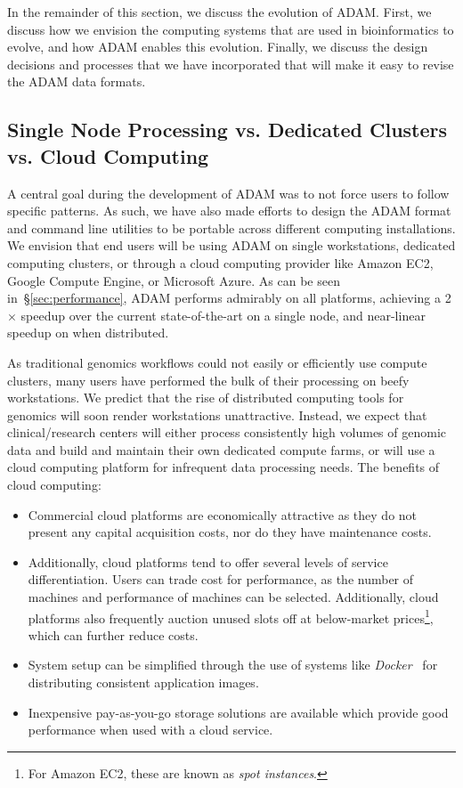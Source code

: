 \documentclass{bioinfo}
\begin{document}
In the remainder of this section, we discuss the evolution of ADAM. First, we discuss how we envision the computing systems that are used in bioinformatics to evolve, and
how ADAM enables this evolution. Finally, we discuss the design decisions and processes that we have incorporated that will make it easy to revise the ADAM data formats.

\subsection{Single Node Processing vs. Dedicated Clusters vs. Cloud Computing}
\label{sec:single-vs-clusters-vs-cloud}

A central goal during the development of ADAM was to not force users to follow specific patterns. As such, we have also made efforts to design the ADAM format and command
line utilities to be portable across different computing installations. We envision that end users will be using ADAM on single workstations, dedicated computing
clusters, or through a cloud computing provider like Amazon EC2, Google Compute Engine, or Microsoft Azure. As can be seen in~\S\ref{sec:performance}, ADAM performs
admirably on all platforms, achieving a 2$\times$ speedup over the current state-of-the-art on a single node, and near-linear speedup on when distributed.

As traditional genomics workflows could not easily or efficiently use compute clusters, many users have performed the bulk of their processing on beefy workstations. We predict
that the rise of distributed computing tools for genomics will soon render workstations unattractive. Instead, we expect that clinical/research centers will either process
consistently high volumes of genomic data and build and maintain their own dedicated compute farms, or will use a cloud computing platform for infrequent data processing
needs. The benefits of cloud computing:

\begin{itemize}
\item Commercial cloud platforms are economically attractive as they do not present any capital acquisition costs, nor do they have maintenance costs.
\item Additionally, cloud platforms tend to offer several levels of service differentiation. Users can trade cost for performance, as the number of machines and performance of
machines can be selected. Additionally, cloud platforms also frequently auction unused slots off at below-market prices\footnote{For Amazon EC2, these are known as
\emph{spot instances}.}, which can further reduce costs.
\item System setup can be simplified through the use of systems like \textit{Docker}~\citep{docker} for distributing consistent application images.
\item Inexpensive pay-as-you-go storage solutions are available which provide good performance when used with a cloud service.
\end{itemize}
\end{document}
